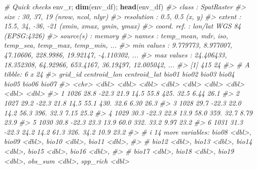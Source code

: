 \documentclass[
]{article}
\newenvironment{Shaded}{\begin{snugshade}}{\end{snugshade}}
\newcommand{\CommentTok}[1]{\textcolor[rgb]{0.56,0.35,0.01}{\textit{#1}}}
\newcommand{\FunctionTok}[1]{\textcolor[rgb]{0.13,0.29,0.53}{\textbf{#1}}}
\newcommand{\NormalTok}[1]{#1}
\begin{document}
\begin{Shaded}
\begin{Highlighting}[]
\CommentTok{\# Quick checks }
\NormalTok{env\_r; }\FunctionTok{dim}\NormalTok{(env\_df); }\FunctionTok{head}\NormalTok{(env\_df)}
\CommentTok{\#\textgreater{} class       : SpatRaster }
\CommentTok{\#\textgreater{} size        : 30, 37, 19  (nrow, ncol, nlyr)}
\CommentTok{\#\textgreater{} resolution  : 0.5, 0.5  (x, y)}
\CommentTok{\#\textgreater{} extent      : 15.5, 34, {-}36, {-}21  (xmin, xmax, ymin, ymax)}
\CommentTok{\#\textgreater{} coord. ref. : lon/lat WGS 84 (EPSG:4326) }
\CommentTok{\#\textgreater{} source(s)   : memory}
\CommentTok{\#\textgreater{} names       : temp\_mean,       mdr,      iso, temp\_sea, temp\_max,  temp\_min, ... }
\CommentTok{\#\textgreater{} min values  :  9.779773,  8.977007, 47.10606, 228.9986, 19.92147, {-}4.110302, ... }
\CommentTok{\#\textgreater{} max values  : 24.406433, 18.352308, 64.92966, 653.4167, 36.19497, 12.005042, ...}
\CommentTok{\#\textgreater{} [1] 415  24}
\CommentTok{\#\textgreater{} \# A tibble: 6 x 24}
\CommentTok{\#\textgreater{}   grid\_id centroid\_lon centroid\_lat bio01 bio02 bio03 bio04 bio05 bio06 bio07}
\CommentTok{\#\textgreater{}   \textless{}chr\textgreater{}          \textless{}dbl\textgreater{}        \textless{}dbl\textgreater{} \textless{}dbl\textgreater{} \textless{}dbl\textgreater{} \textless{}dbl\textgreater{} \textless{}dbl\textgreater{} \textless{}dbl\textgreater{} \textless{}dbl\textgreater{} \textless{}dbl\textgreater{}}
\CommentTok{\#\textgreater{} 1 1026            28.8        {-}22.3  21.9  14.5  55.8  425.  32.5  6.44  26.1}
\CommentTok{\#\textgreater{} 2 1027            29.2        {-}22.3  21.8  14.5  55.1  430.  32.6  6.30  26.3}
\CommentTok{\#\textgreater{} 3 1028            29.7        {-}22.3  22.0  14.2  56.3  396.  32.3  7.15  25.2}
\CommentTok{\#\textgreater{} 4 1029            30.3        {-}22.3  22.8  13.9  58.0  359.  32.7  8.79  23.9}
\CommentTok{\#\textgreater{} 5 1030            30.8        {-}22.3  23.3  13.9  60.0  332.  33.2  9.97  23.2}
\CommentTok{\#\textgreater{} 6 1031            31.3        {-}22.3  24.2  14.2  61.3  326.  34.2 10.9   23.2}
\CommentTok{\#\textgreater{} \# i 14 more variables: bio08 \textless{}dbl\textgreater{}, bio09 \textless{}dbl\textgreater{}, bio10 \textless{}dbl\textgreater{}, bio11 \textless{}dbl\textgreater{},}
\CommentTok{\#\textgreater{} \#   bio12 \textless{}dbl\textgreater{}, bio13 \textless{}dbl\textgreater{}, bio14 \textless{}dbl\textgreater{}, bio15 \textless{}dbl\textgreater{}, bio16 \textless{}dbl\textgreater{},}
\CommentTok{\#\textgreater{} \#   bio17 \textless{}dbl\textgreater{}, bio18 \textless{}dbl\textgreater{}, bio19 \textless{}dbl\textgreater{}, obs\_sum \textless{}dbl\textgreater{}, spp\_rich \textless{}dbl\textgreater{}}


\end{Highlighting}
\end{Shaded}
\end{document}
